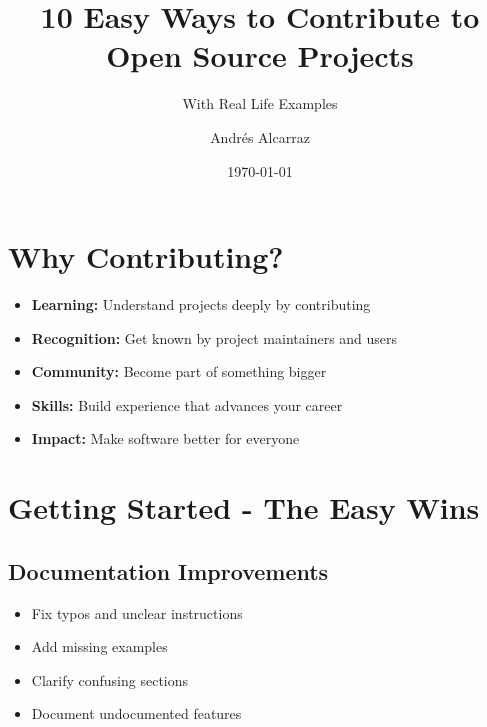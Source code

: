 \documentclass{presentacion}
\title[Contributing to Open Source] 
{10 Easy Ways to Contribute to Open Source Projects}
\subtitle{With Real Life Examples}
\author{Andrés Alcarraz}
\date{\today}
\begin{document}
\frame{\titlepage}

\section{Why Contributing?}
\begin{frame}
    \begin{itemize}[<+->]
        \item \textbf{Learning:} Understand projects deeply by contributing
        \item \textbf{Recognition:} Get known by project maintainers and users  
        \item \textbf{Community:} Become part of something bigger
        \item \textbf{Skills:} Build experience that advances your career
        \item \textbf{Impact:} Make software better for everyone
    \end{itemize}
    \vspace{1em}
\end{frame}

\section{Getting Started - The Easy Wins}

\subsection{Documentation Improvements}
\begin{frame}
    \begin{itemize}[<+->]
        \item Fix typos and unclear instructions
        \item Add missing examples
        \item Clarify confusing sections
        \item Document undocumented features
    \end{itemize}
    
    \vspace{1em}
\end{frame}
\end{document}
